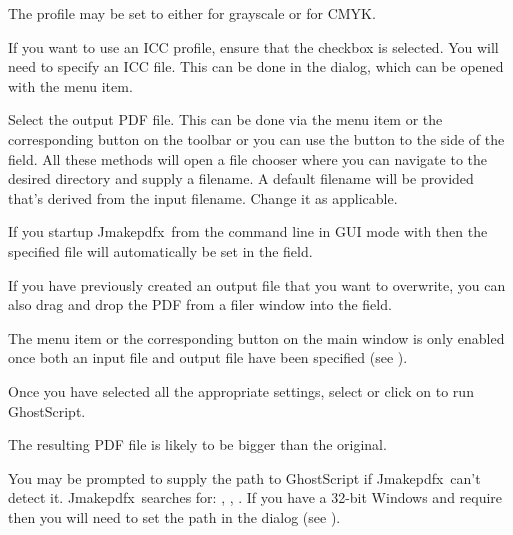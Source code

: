 \documentclass[toc=listof]{scrreport}
\newcommand{\Jmakepdfx}{Jmakepdfx}
\begin{document}
The profile may be set to either 
for grayscale or  for CMYK.

If you want to use an \gls{ICC} profile, ensure that the
 checkbox is selected. You will need to
specify an \gls{ICC} file. This can be done in the
 dialog,
which can be opened with the  menu item.

Select the output PDF file. This can be done via the 
 menu item or the corresponding button on the
toolbar or you can use the  button to the
side of the  field. All these methods will open a
file chooser where you can navigate to the desired directory and
supply a filename. A default filename will be provided that's derived from
the input filename. Change it as applicable.

\begin{information}
If you startup \Jmakepdfx\ from the command line in \gls{GUI} mode
with  then the specified file will automatically be
set in the  field.
\end{information}

If you have previously created an output file that you want to
overwrite, you can also drag and drop the
PDF from a filer window into the  field.

The  menu item or the corresponding button on the
main window is only enabled once both an input file and output file
have been specified (see ). 

Once you have selected all the appropriate settings,
select  or click on 
 to run GhostScript.

\begin{information}
The resulting PDF file is likely to be bigger than the original.
\end{information}

You may be prompted to supply the path to GhostScript if 
\Jmakepdfx\ can't detect it. \Jmakepdfx\ searches for:
, , .
If you have a 32-bit Windows and require 
then you will need to set the path in the  dialog
(see ).
\end{document}
